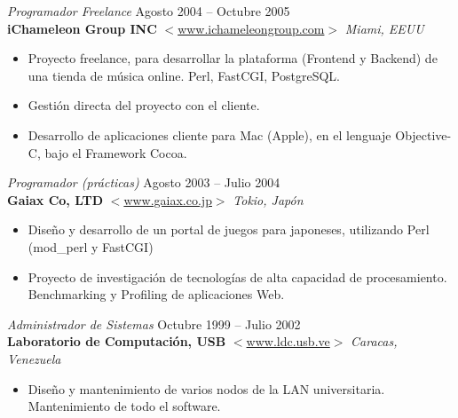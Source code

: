 \documentclass[line,margin]{res}
\begin{document}
\begin{resume}
                {\sl Programador Freelance} \hfill Agosto 2004 -- Octubre 
                2005 \\
                \textbf{iChameleon Group INC} 
                $<$\url{www.ichameleongroup.com}$>$ \hfill \textit{Miami, EEUU}
                \begin{itemize}  \itemsep 2pt %
                \item Proyecto freelance, para desarrollar la plataforma 
                (Frontend y Backend) de una tienda de m\'{u}sica online. Perl, 
                FastCGI, PostgreSQL.
                \item Gesti\'{o}n directa del proyecto con el cliente.
                \item Desarrollo de aplicaciones cliente para Mac (Apple), en el 
                lenguaje Objective-C, bajo el Framework Cocoa.
                \\
                \end{itemize}

                {\sl Programador (pr\'{a}cticas)} \hfill Agosto 2003 -- Julio 
                2004 \\
                \textbf{Gaiax Co, LTD} 
                $<$\url{www.gaiax.co.jp}$>$ \hfill \textit{Tokio, 
                Jap\'{o}n}
                \begin{itemize}  \itemsep 2pt %
                \item Dise\~{n}o y desarrollo de un portal de juegos para 
                japoneses, utilizando Perl (mod\_perl y FastCGI)
                \item Proyecto de investigaci\'{o}n de tecnolog\'{i}as de 
                alta capacidad de procesamiento. Benchmarking y Profiling de 
                aplicaciones Web.
                \\
                \end{itemize} 

                {\sl Administrador de Sistemas} \hfill Octubre 1999 -- Julio 
                2002 \\
                \textbf{Laboratorio de Computaci\'{o}n, USB} 
                $<$\url{www.ldc.usb.ve}$>$
                \hfill \textit{Caracas, Venezuela}
                \begin{itemize}  \itemsep 2pt %
                \item Dise\~{n}o y mantenimiento de varios nodos de la LAN 
                universitaria. Mantenimiento de todo el software.
                \end{itemize}

\end{resume}
\end{document}

